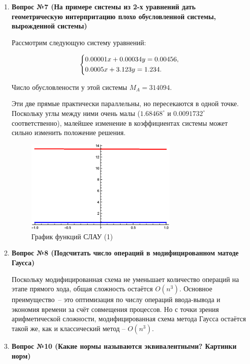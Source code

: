 \documentclass[12pt, a4paper]{article}
\begin{document}
\begin{enumerate}
		\item \textbf{Вопрос №7 (На примере системы из 2-х уравнений дать геометрическую интерпритацию плохо обусловленной системы, вырожденной системы)}
		
		Рассмотрим следующую систему уравнений:
		
		\begin{equation}
			\begin{dcases}
				0.00001x + 0.00034y = 0.00456, \\
				0.0005x + 3.123y = 1.234. 
			\end{dcases}
		\end{equation}
		
		Число обусловлености у этой системы $M_{A}= 314094$.
		
		Эти две прямые практически параллельны, но пересекаются в одной точке. Поскольку углы между ними очень малы ($1.68468^\circ$ и $0.0091732^\circ$ соответственно), малейшее изменение в коэффициентах системы может сильно изменить положение решения.
		
		\begin{figure}[!h]
			\center
			\includegraphics[width=0.7\textwidth]{graph1}
			\caption{График функций СЛАУ (1)}
			\label{graph1}
		\end{figure}	
		
		\item \textbf{Вопрос №8 (Подсчитать число операций в модифицированном матоде Гаусса)}
		
		Поскольку модифицированная схема не уменьшает количество операций на этапе прямого хода, общая сложность остаётся $O(n^3)$. Основное преимущество~-- это оптимизация по числу операций ввода-вывода и экономия времени за счёт совмещения процессов. Но с точки зрения арифметической сложности, модифицированная схема метода Гаусса остаётся такой же, как и классический метод -- $O(n^3)$.
		
		\item \textbf{Вопрос №10 (Какие нормы называются эквивалентными? Картинки норм)}
		

\end{enumerate}
\end{document}
